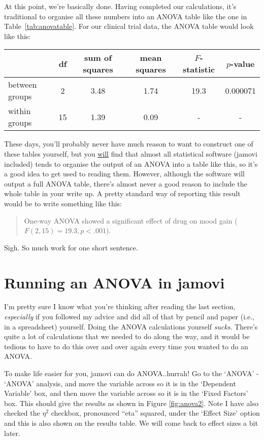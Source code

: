 At this point, we're basically done. Having completed our calculations, it's traditional to organise all these numbers into an ANOVA table like the one in Table~\ref{tab:anovatable}. For our clinical trial data, the ANOVA table would look like this:
\begin{center}
\begin{tabular}{l|ccccc} 
& df & sum of squares & mean squares & $F$-statistic & $p$-value \\  \hline 
between groups & 2 & 3.48 & 1.74 & 19.3 & 0.000071 \\
within groups   & 15 & 1.39 & 0.09 & - & - \\ 
\end{tabular}
\end{center}
\noindent
These days, you'll probably never have much reason to want to construct one of these tables yourself, but you \underline{will} find that almost all statistical software (jamovi included) tends to organise the output of an ANOVA into a table like this, so it's a good idea to get used to reading them. However, although the software will output a full ANOVA table, there's almost never a good reason to include the whole table in your write up. A pretty standard way of reporting this result would be to write something like this:
\begin{quote}
One-way ANOVA showed a significant effect of drug on mood gain ($F(2,15) = 19.3, p<.001$).
\end{quote}
Sigh. So much work for one short sentence.


\section{Running an ANOVA in jamovi\label{sec:introduceaov}}

I'm pretty sure I know what you're thinking after reading the last section, {\it especially} if you followed my advice and did all of that by pencil and paper (i.e., in a spreadsheet) yourself. Doing the ANOVA calculations yourself {\it sucks}. There's quite a lot of calculations that we needed to do along the way, and it would be tedious to have to do this over and over again every time you wanted to do an ANOVA. 


To make life easier for you, jamovi can do ANOVA..hurrah! Go to the `ANOVA' - `ANOVA' analysis, and move the  variable across so it is in the `Dependent Variable' box, and then move the  variable across so it is in the `Fixed Factors' box. This should give the results as shown in Figure \ref{fig:anova2}.  Note I have also checked the $\eta^2$ checkbox, pronounced ``eta'' squared, under the `Effect Size' option and this is also shown on the results table. We will come back to effect sizes a bit later.

